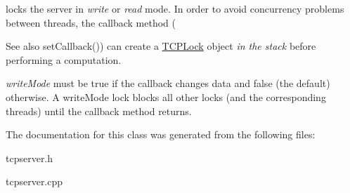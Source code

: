 locks the server in {\itshape write} or {\itshape read} mode. In order to avoid concurrency problems between threads, the callback method ( 

\begin{DoxySeeAlso}{See also}
set\+Callback()) can create a \hyperlink{classcppu_1_1TCPLock}{T\+C\+P\+Lock} object {\itshape in the stack} before performing a computation.
\end{DoxySeeAlso}
{\itshape write\+Mode} must be true if the callback changes data and false (the default) otherwise. A write\+Mode lock blocks all other locks (and the corresponding threads) until the callback method returns. 

The documentation for this class was generated from the following files\+:\begin{DoxyCompactItemize}
\item 
tcpserver.\+h\item 
tcpserver.\+cpp\end{DoxyCompactItemize}
